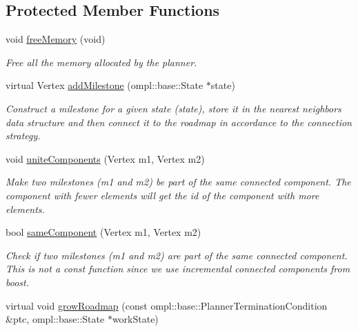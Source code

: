 \subsection*{\-Protected \-Member \-Functions}
\begin{DoxyCompactItemize}
\item 
\hypertarget{class_f_i_r_m_af6951ffec04529fd8da990978d7d8d19}{void \hyperlink{class_f_i_r_m_af6951ffec04529fd8da990978d7d8d19}{free\-Memory} (void)}\label{class_f_i_r_m_af6951ffec04529fd8da990978d7d8d19}

\begin{DoxyCompactList}\small\item\em \-Free all the memory allocated by the planner. \end{DoxyCompactList}\item 
virtual \-Vertex \hyperlink{class_f_i_r_m_a6b72ace6d1708b25bf8c7f69331ae82b}{add\-Milestone} (ompl\-::base\-::\-State $\ast$state)
\begin{DoxyCompactList}\small\item\em \-Construct a milestone for a given state ({\itshape state\/}), store it in the nearest neighbors data structure and then connect it to the roadmap in accordance to the connection strategy. \end{DoxyCompactList}\item 
\hypertarget{class_f_i_r_m_a34535f25e4f3fb645fb65d57e3faf01b}{void \hyperlink{class_f_i_r_m_a34535f25e4f3fb645fb65d57e3faf01b}{unite\-Components} (\-Vertex m1, \-Vertex m2)}\label{class_f_i_r_m_a34535f25e4f3fb645fb65d57e3faf01b}

\begin{DoxyCompactList}\small\item\em \-Make two milestones ({\itshape m1\/} and {\itshape m2\/}) be part of the same connected component. \-The component with fewer elements will get the id of the component with more elements. \end{DoxyCompactList}\item 
\hypertarget{class_f_i_r_m_a2045f113f0755ae8eeac2c35c7c08d41}{bool \hyperlink{class_f_i_r_m_a2045f113f0755ae8eeac2c35c7c08d41}{same\-Component} (\-Vertex m1, \-Vertex m2)}\label{class_f_i_r_m_a2045f113f0755ae8eeac2c35c7c08d41}

\begin{DoxyCompactList}\small\item\em \-Check if two milestones ({\itshape m1\/} and {\itshape m2\/}) are part of the same connected component. \-This is not a const function since we use incremental connected components from boost. \end{DoxyCompactList}\item 
\hypertarget{class_f_i_r_m_ae33b03b6c78466e4a47f7b6d9f59d7f8}{virtual void \hyperlink{class_f_i_r_m_ae33b03b6c78466e4a47f7b6d9f59d7f8}{grow\-Roadmap} (const ompl\-::base\-::\-Planner\-Termination\-Condition \&ptc, ompl\-::base\-::\-State $\ast$work\-State)}\label{class_f_i_r_m_ae33b03b6c78466e4a47f7b6d9f59d7f8}


\end{DoxyCompactItemize}
